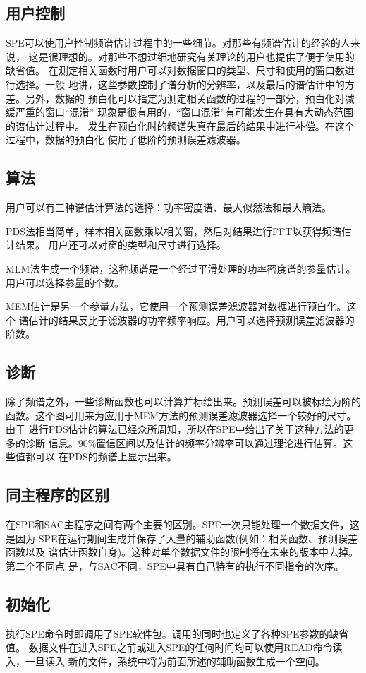 \subsection{用户控制}
SPE可以使用户控制频谱估计过程中的一些细节。对那些有频谱估计的经验的人来说，
这是很理想的。对那些不想过细地研究有关理论的用户也提供了便于使用的缺省值。
在测定相关函数时用户可以对数据窗口的类型、尺寸和使用的窗口数进行选择。一般
地讲，这些参数控制了谱分析的分辨率，以及最后的谱估计中的方差。另外，数据的
预白化可以指定为测定相关函数的过程的一部分，预白化对减缓严重的窗口``混淆''
现象是很有用的，``窗口混淆''有可能发生在具有大动态范围的谱估计过程中。
发生在预白化时的频谱失真在最后的结果中进行补偿。在这个过程中，数据的预白化
使用了低阶的预测误差滤波器。

\subsection{算法}
用户可以有三种谱估计算法的选择：功率密度谱、最大似然法和最大熵法。

PDS法相当简单，样本相关函数乘以相关窗，然后对结果进行FFT以获得频谱估计结果。
用户还可以对窗的类型和尺寸进行选择。

MLM法生成一个频谱，这种频谱是一个经过平滑处理的功率密度谱的参量估计。
用户可以选择参量的个数。

MEM估计是另一个参量方法，它使用一个预测误差滤波器对数据进行预白化。这个
谱估计的结果反比于滤波器的功率频率响应。用户可以选择预测误差滤波器的阶数。

\subsection{诊断}
除了频谱之外，一些诊断函数也可以计算并标绘出来。预测误差可以被标绘为阶的
函数。这个图可用来为应用于MEM方法的预测误差滤波器选择一个较好的尺寸。由于
进行PDS估计的算法已经众所周知，所以在SPE中给出了关于这种方法的更多的诊断
信息。90\%置信区间以及估计的频率分辨率可以通过理论进行估算。这些值都可以
在PDS的频谱上显示出来。

\subsection{同主程序的区别}
在SPE和SAC主程序之间有两个主要的区别。SPE一次只能处理一个数据文件，这是因为
SPE在运行期间生成并保存了大量的辅助函数(例如：相关函数、预测误差函数以及
谱估计函数自身)。这种对单个数据文件的限制将在未来的版本中去掉。第二个不同点
是，与SAC不同，SPE中具有自己特有的执行不同指令的次序。

\subsection{初始化}
执行SPE命令时即调用了SPE软件包。调用的同时也定义了各种SPE参数的缺省值。
数据文件在进入SPE之前或进入SPE的任何时间均可以使用READ命令读入，一旦读入
新的文件，系统中将为前面所述的辅助函数生成一个空间。

